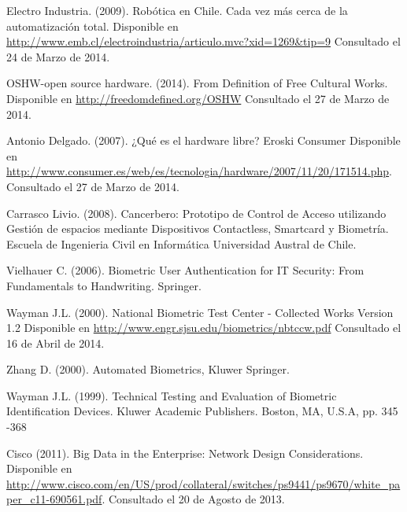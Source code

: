 
\begin{spacing}{1.0}
\begin{thebibliography}{99}  

Electro Industria. (2009).
\newblock Robótica en Chile. Cada vez más cerca de la automatización total.
\newblock Disponible en \url{http://www.emb.cl/electroindustria/articulo.mvc?xid=1269&tip=9}
\newblock Consultado el 24 de Marzo de 2014.

OSHW-open source hardware. (2014).
\newblock From Definition of Free Cultural Works.
\newblock Disponible en \url{http://freedomdefined.org/OSHW}
\newblock Consultado el 27 de Marzo de 2014.

Antonio Delgado. (2007).
\newblock ¿Qué es el hardware libre?
\newblock Eroski Consumer
\newblock Disponible en \url{http://www.consumer.es/web/es/tecnologia/hardware/2007/11/20/171514.php}.
\newblock Consultado el 27 de Marzo de 2014.

Carrasco Livio.  (2008).
\newblock Cancerbero: Prototipo de Control de Acceso utilizando Gestión de espacios mediante Dispositivos Contactless, Smartcard y Biometría.
\newblock Escuela de Ingenieria Civil en Informática
\newblock Universidad Austral  de Chile. 

Vielhauer C. (2006).
\newblock Biometric User Authentication for IT Security: From Fundamentals to Handwriting.
\newblock Springer.

Wayman J.L. (2000).
\newblock National Biometric Test Center - Collected Works Version 1.2
\newblock Disponible en \url{http://www.engr.sjsu.edu/biometrics/nbtccw.pdf}
\newblock Consultado el 16 de Abril de 2014.


Zhang D. (2000).
\newblock Automated Biometrics, Kluwer
\newblock Springer.


Wayman J.L. (1999).
\newblock Technical Testing and Evaluation of Biometric Identification Devices.
\newblock Kluwer Academic Publishers.
\newblock Boston, MA, U.S.A, pp. 345 -368





Cisco (2011).
\newblock Big Data in the Enterprise: Network Design Considerations.
\newblock Disponible en \url{http://www.cisco.com/en/US/prod/collateral/switches/ps9441/ps9670/white_paper_c11-690561.pdf}.
\newblock Consultado el 20 de Agosto de 2013.


\end{thebibliography}
\end{spacing}
